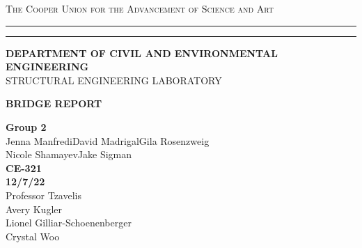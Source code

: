 \begin{titlepage}
    \begin{center}
    {{\Large{\textsc{The Cooper Union for the Advancement of Science and Art}}}} \rule[0.1cm]{15.8cm}{0.1mm}
    \rule[0.5cm]{15.8cm}{0.6mm}
    {\small{\bf DEPARTMENT OF CIVIL AND ENVIRONMENTAL ENGINEERING}}\\
    {\footnotesize{STRUCTURAL ENGINEERING LABORATORY}}
    \end{center}
    \vspace{15mm}
    \begin{center}
    {\Large{\bf BRIDGE REPORT}}
    \end{center}
    \vspace{35mm}
    \par
    \noindent
    \hfill
    \vspace{20mm}
    \begin{center}
    {\large{ {\bf Group 2} \\ { Jenna Manfredi\hspace{5mm}David Madrigal\hspace{5mm}Gila Rosenzweig\\Nicole Shamayev\hspace{5mm}Jake Sigman}}}
    \vspace{40mm}
    {\large {\bf \\CE-321 \\ 12/7/22 \\}}
    \vspace{15mm}
    {\normalsize{Professor Tzavelis \\ Avery Kugler \\ Lionel Gilliar-Schoenenberger \\ Crystal Woo}}
    \end{center}
\end{titlepage}